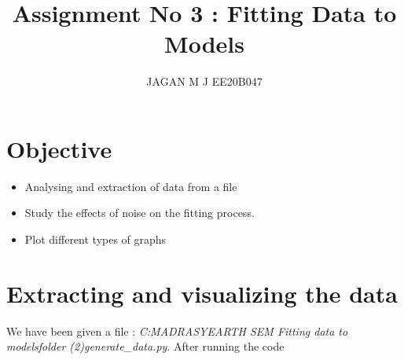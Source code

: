\documentclass[12pt]{article}
\begin{document}
\title{Assignment No 3 : Fitting Data to Models}
\author{JAGAN M J EE20B047}
\maketitle

\section{Objective}
\begin{itemize}
\item Analysing and extraction of data from a file
\item Study the effects of noise on the fitting process.
\item Plot different types of graphs
\end{itemize}

\section{Extracting and visualizing the data}

We have been given a file : \textit{C:\IIT MADRAS\COURSE\SECOND YEAR\4TH SEM Fitting data to models\New folder (2){generate_data.py}}. After running the code
\end{document}
